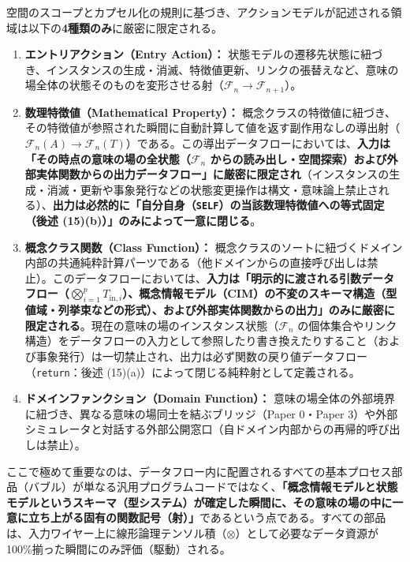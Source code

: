\documentclass[11pt,a4paper]{ltjsarticle}
\theoremstyle{definition}
\theoremstyle{plain}
\theoremstyle{remark}
\begin{document}
空間のスコープとカプセル化の規則に基づき、アクションモデルが記述される領域は以下の\textbf{4種類のみ}に厳密に限定される。
\begin{enumerate}
    \item \textbf{エントリアクション（Entry Action）：} 状態モデルの遷移先状態に紐づき、インスタンスの生成・消滅、特徴値更新、リンクの張替えなど、意味の場全体の状態そのものを変形させる射（$\mathcal{F}_n \to \mathcal{F}_{n+1}$）。
    \item \textbf{数理特徴値（Mathematical Property）：} 概念クラスの特徴値に紐づき、その特徴値が参照された瞬間に自動計算して値を返す副作用なしの導出射（$\mathcal{F}_n(A) \to \mathcal{F}_n(T)$）である。この導出データフローにおいては、\textbf{入力は「その時点の意味の場の全状態（$\mathcal{F}_n$ からの読み出し・空間探索）および外部実体関数からの出力データフロー」に厳密に限定され}（インスタンスの生成・消滅・更新や事象発行などの状態変更操作は構文・意味論上禁止される）、\textbf{出力は必然的に「自分自身（\texttt{SELF}）の当該数理特徴値への等式固定（後述 (15)(b)）」のみによって一意に閉じる}。
    \item \textbf{概念クラス関数（Class Function）：} 概念クラスのソートに紐づくドメイン内部の共通純粋計算パーツである（他ドメインからの直接呼び出しは禁止）。このデータフローにおいては、\textbf{入力は「明示的に渡される引数データフロー（$\bigotimes_{i=1}^p T_{\mathrm{in}, i}$）、概念情報モデル（CIM）の不変のスキーマ構造（型値域・列挙束などの形式）、および外部実体関数からの出力」のみに厳密に限定される}。現在の意味の場のインスタンス状態（$\mathcal{F}_n$ の個体集合やリンク構造）をデータフローの入力として参照したり書き換えたりすること（および事象発行）は一切禁止され、出力は必ず関数の戻り値データフロー（\texttt{return}：後述 (15)(a)）によって閉じる純粋射として定義される。
    \item \textbf{ドメインファンクション（Domain Function）：} 意味の場全体の外部境界に紐づき、異なる意味の場同士を結ぶブリッジ（Paper 0・Paper 3）や外部シミュレータと対話する外部公開窓口（自ドメイン内部からの再帰的呼び出しは禁止）。
\end{enumerate}

ここで極めて重要なのは、データフロー内に配置されるすべての基本プロセス部品（バブル）が単なる汎用プログラムコードではなく、\textbf{「概念情報モデルと状態モデルというスキーマ（型システム）が確定した瞬間に、その意味の場の中に一意に立ち上がる固有の関数記号（射）」}であるという点である。すべての部品は、入力ワイヤー上に線形論理テンソル積（$\otimes$）として必要なデータ資源が100\%揃った瞬間にのみ評価（駆動）される。
\end{document}
